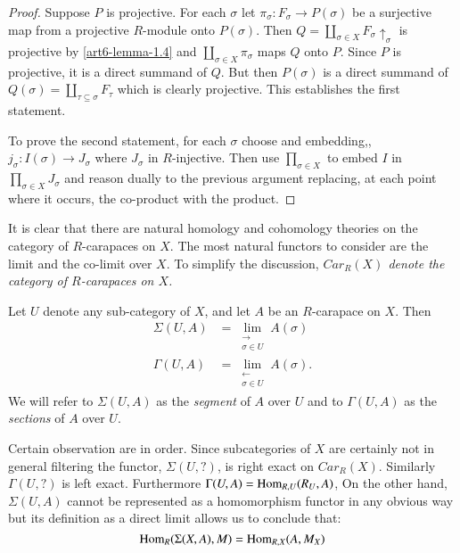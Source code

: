 \begin{proof}
Suppose $P$ is projective. For each $\sigma$ let $\pi_{\sigma}: F_{\sigma}\rightarrow P(\sigma)$ be a surjective map from a projective $R$-module onto  $P(\sigma)$. Then $Q= \coprod_{\sigma \in X}F_{\sigma} \uparrow_{\sigma}$ is projective by \ref{art6-lemma-1.4} and $\coprod_{\sigma \in X}\pi_{\sigma}$ maps $Q$ onto $P$. Since $P$ is projective, it is a direct summand of $Q$. But then $P(\sigma)$ is a  direct summand of $Q(\sigma) = \coprod_{\tau \subseteq \sigma}F_{\tau}$ which is clearly projective. This establishes the first statement.

To prove the second statement, for each $\sigma$ choose and embedding,, $j_{\sigma} : I(\sigma) \rightarrow J_{\sigma}$ where $J_{\sigma}$ in $R$-injective. Then use $\prod_{\sigma\in X}$ to embed $I$ in $\prod_{\sigma \in X}J_{\sigma}$ and reason dually to the previous argument replacing, at each point where it occurs, the co-product with the product. 
\end{proof}

It is clear that there are natural homology and cohomology theories on the category of $R$-carapaces on $X$. The most natural functors to consider are the limit and the co-limit over $X$. To simplify the discussion, \textit{$C ar_{R}(X)$ denote the category of $R$-carapaces on $X$.}

\begin{definition}\label{art6-prop-1.7}
Let $U$ denote any sub-category of $X$, and let $A$ be an $R$-carapace on $X$. Then
\begin{align*}
\Sigma (U, A) &= \lim\limits_{\substack{\longrightarrow \\ \sigma \in U}}A(\sigma)\\
\Gamma (U, A) &= \lim\limits_{\substack{\longleftarrow \\ \sigma \in U}}A(\sigma).
\end{align*}
We will refer to $\Sigma(U, A)$ as the \textit{segment} of $A$ over $U$ and to $\Gamma(U, A)$ as the \textit{sections} of $A$ over $U$.
\end{definition}

Certain observation are in order. Since subcategories of $X$ are certainly not in general filtering the functor, $\Sigma(U, ?)$, is right exact on $C ar_{R}(X)$. Similarly $\Gamma(U, ?)$ is left exact. Furthermore $\Gamma(U, A) = \operatorname{Hom}_{R, U}(R_{U}, A)$, On the other hand, $\Sigma(U, A)$ cannot be represented as a homomorphism functor in any obvious way but its definition as a direct limit allows us to conclude that:
$$
\operatorname{Hom}_{R}(\Sigma(X, A), M) = \operatorname{Hom}_{R, X}(A, M_{X})
$$ 

